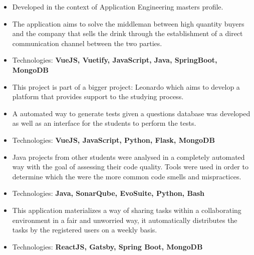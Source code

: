 \documentclass[10pt,a4paper,ragged2e,withhyper]{assets/altacv}
\begin{document}
\begin{paracol}{2}
\switchcolumn


\begin{itemize}
    \item Developed in the context of Application Engineering masters profile.
    \item The application aims to solve the middleman between high quantity buyers and the company that sells the drink through the establishment of a direct communication channel between the two parties.
    \item Technologies: \textbf{VueJS, Vuetify, JavaScript, Java, SpringBoot, MongoDB} 
\end{itemize}

\divider

\begin{itemize}
    \item This project is part of a bigger project: Leonardo which aims to develop a platform that provides support to the studying process.
    \item A automated way to generate tests given a questions database was developed as well as an interface for the students to perform the tests.
    \item Technologies: \textbf{VueJS, JavaScript, Python, Flask, MongoDB}
\end{itemize}

\divider

\begin{itemize}
    \item Java projects from other students were analysed in a completely automated way with the goal of assessing their code quality. Tools were used in order to determine which the were the more common code smells and mispractices.
    \item Technologies: \textbf{Java, SonarQube, EvoSuite, Python, Bash}
\end{itemize}

\divider

\begin{itemize}
    \item This application materializes a way of sharing tasks within a collaborating environment in a fair and unworried way, it automatically distributes the tasks by the registered users on a weekly basis.
    \item Technologies: \textbf{ReactJS, Gatsby, Spring Boot, MongoDB}
\end{itemize}


\end{paracol}
\end{document}

